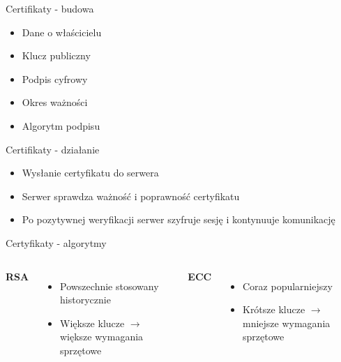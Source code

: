 \begin{frame}{Certifikaty - budowa}
    \begin{itemize}
        \item Dane o właścicielu
        \item Klucz publiczny
        \item Podpis cyfrowy
        \item Okres ważności
        \item Algorytm podpisu
    \end{itemize}

\end{frame}

\begin{frame}{Certifikaty - działanie}
    \begin{itemize}
        \item Wysłanie certyfikatu do serwera
        \item Serwer sprawdza ważność i poprawność certyfikatu
        \item Po pozytywnej weryfikacji serwer szyfruje sesję i kontynuuje komunikację
    \end{itemize}
    
\end{frame}

\begin{frame}{Certyfikaty - algorytmy}

    \begin{columns}
        \centering
        
        \textbf{RSA}
        \begin{itemize}
            \item Powszechnie stosowany historycznie
            \item Większe klucze $\rightarrow$ większe wymagania sprzętowe
        \end{itemize}
        
        \centering

        \textbf{ECC}  
        \begin{itemize}
            \item Coraz popularniejszy
            \item Krótsze klucze $\rightarrow$ mniejsze wymagania sprzętowe
        \end{itemize}
        \vspace{7.5pt}

    \end{columns}

\end{frame}


